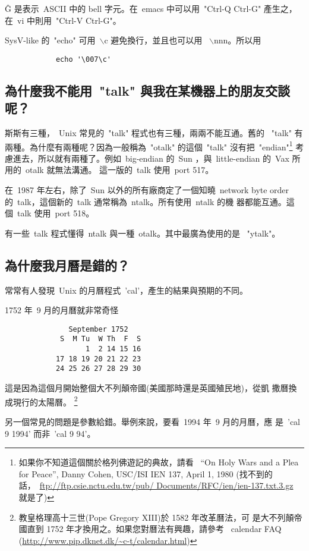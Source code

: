 \documentclass{article}
\begin{document}
\begin{CJK*}{Bg5}{ming}
	\^G 是表示~ASCII 中的 bell 字元。在~emacs 中可以用~"Ctrl-Q Ctrl-G" 
	產生之，在~vi 中則用~"Ctrl-V Ctrl-G"。

	SysV-like 的~"echo" 可用~$\backslash$c 避免換行，並且也可以用
	~$\backslash$nnn。所以用
\begin{verbatim}
	        echo '\007\c'
\end{verbatim}

\subsection{為什麼我不能用~"talk" 與我在某機器上的朋友交談呢？}

	斯斯有三種，~Unix 常見的~"talk" 程式也有三種，兩兩不能互通。舊的 
	~"talk" 有兩種。為什麼有兩種呢？因為一般稱為~"otalk" 的這個~"talk" 
	沒有把~"endian"\footnote{如果你不知道這個關於格列佛遊記的典故，請看
	~``On Holy Wars and a Plea for Peace'', Danny Cohen, USC/ISI IEN 137, 
	April 1, 1980 (找不到的話，~\url{ftp://ftp.csie.nctu.edu.tw/pub/
	Documents/RFC/ien/ien-137.txt.3.gz} 就是了)} 考慮進去，所以就有兩種了。例如~big-endian 的~Sun 
	，與~little-endian 的~Vax 所用的~otalk 就無法溝通。 這一版的~talk 
	使用~port 517。

	在~1987 年左右，除了~Sun 以外的所有廠商定了一個知曉~network byte 
	order 的~talk，這個新的~talk 通常稱為~ntalk。所有使用~ntalk 的機
	器都能互通。這個~talk 使用~port 518。

	有一些~talk 程式懂得~ntalk 與一種~otalk。其中最廣為使用的是 
	~"ytalk"。

\subsection{為什麼我月曆是錯的？}

	常常有人發現~Unix 的月曆程式~'cal'，產生的結果與預期的不同。

	1752 年~9 月的月曆就非常奇怪
\begin{verbatim}
               September 1752
             S  M Tu  W Th  F  S
                   1  2 14 15 16
            17 18 19 20 21 22 23
            24 25 26 27 28 29 30
\end{verbatim}
	這是因為這個月開始整個大不列顛帝國(美國那時還是英國殖民地)，從凱
	撒曆換成現行的太陽曆。
	\footnote{教皇格理高十三世(Pope Gregory XIII)於 1582 年改革曆法，可
        是大不列顛帝國直到 1752 年才換用之。如果您對曆法有興趣，請參考 
	~calendar FAQ (\url{http://www.pip.dknet.dk/~c-t/calendar.html})}

	另一個常見的問題是參數給錯。舉例來說，要看~1994 年~9 月的月曆，應
	是~'cal 9 1994' 而非~'cal 9 94'。 


\end{CJK*}
\end{document}
